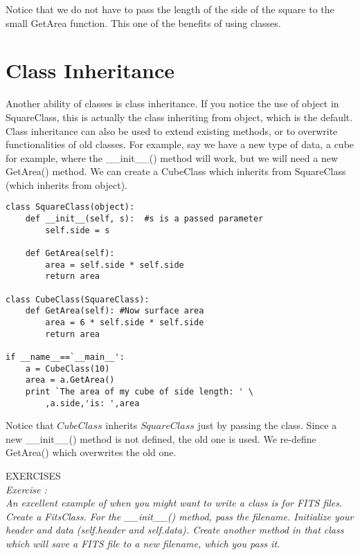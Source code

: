 Notice that we do not have to pass the length of the side of the
square to the {\sf small GetArea} function.  This one of the benefits
of using classes.

\section{Class Inheritance}
Another ability of classes is class inheritance.  If you notice the
use of {\sf \small object} in {\sf \small SquareClass}, this is
actually the class inheriting from {\sf \small object}, which is the
default.  Class inheritance can also be used to extend existing
methods, or to overwrite functionalities of old classes.  For example,
say we have a new type of data, a cube for example, where the {\sf
  \small \_\_init\_\_()} method will work, but we will need a new {\sf
  \small GetArea()} method.  We can create a {\sf \small CubeClass}
which inherits from {\sf \small SquareClass} (which inherits from {\sf
  \small object}).

\begin{verbatim}
class SquareClass(object):
    def __init__(self, s):  #s is a passed parameter
        self.side = s

    def GetArea(self):
        area = self.side * self.side
        return area

class CubeClass(SquareClass):
    def GetArea(self): #Now surface area
        area = 6 * self.side * self.side
        return area

if __name__==`__main__':
    a = CubeClass(10)
    area = a.GetArea()
    print `The area of my cube of side length: ' \
        ,a.side,'is: ',area
\end{verbatim}

Notice that $CubeClass$ inherits $SquareClass$ just by passing the
class.  Since a new {\sf \small \_\_init\_\_()} method is not defined,
the old one is used.  We re-define {\sf \small GetArea()} which
overwrites the old one.

{\color{blue} {\sf\small EXERCISES}} \\
{\it Exercise  :  \\
  An excellent example of when you might want to write a class is for
  FITS files.  Create a FitsClass.  For the {\sf \small
    \_\_init\_\_()} method, pass the filename.  Initialize your header
  and data (self.header and self.data).  Create another method in that
  class which will save a FITS file to a new filename, which you pass
  it.}


